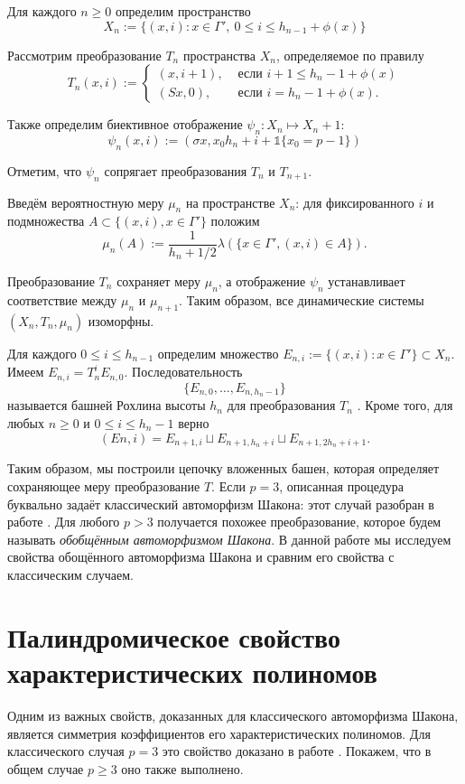 \documentclass[14pt, a4paper, russian]{report}
\begin{document}
Для каждого $n \ge 0$ определим пространство
$$X_n:=\{(x,i): x \in \Gamma',\ 0 \le i \le h_{n-1} + \phi(x)\}$$

Рассмотрим преобразование $T_n$ пространства $X_n$, определяемое по правилу
$$T_n(x, i) := \begin{cases}
(x,i+1), & \text{ если } i+1 \le h_n - 1 + \phi(x) \\
(Sx,0), & \text{ если } i=h_n-1+\phi(x). \end{cases}$$

Также определим биективное отображение $\psi_n : X_n \mapsto X_n+1$:
$$\psi_n(x,i):=(\sigma x, x_0 h_n + i + \mathbb{1}\{x_0=p-1\})$$

Отметим, что $\psi_n$ сопрягает преобразования $T_n$ и
$T_{n+1}$.

Введём вероятностную меру $\mu_n$ на пространстве $X_n$: для фиксированного $i$ и подмножества
$A \subset \{(x, i), x\in\Gamma' \}$ положим
$$\mu_n(A):=\frac{1}{h_n + 1/2} \lambda (\{x \in \Gamma', (x, i) \in A\}).$$

Преобразование $T_n$ сохраняет меру $\mu_n$, а отображение $\psi_n$ устанавливает соответствие между $\mu_n$ и $\mu_{n+1}$. Таким образом, все динамические системы $(X_n, T_n, \mu_n)$ изоморфны.

Для каждого $ 0 \le i \le h_{n-1}$ определим множество
$E_{n,i} := \{(x, i) : x \in \Gamma'\} \subset X_n$. Имеем $E_{n,i} = T^i_n E_{n,0}$. Последовательность
 $$\{E_{n,0},\ldots,E_{n,h_n-1}\}$$
называется башней Рохлина высоты $h_n$ для преобразования $T_n$ \cite{rokhlin_towers}. Кроме того, для любых $n \ge 0$ и $0 \le i \le h_n-1$ верно 
\begin{equation}\label{eq:embedding}
(En,i) = E_{n+1,i} \sqcup E_{n+1,h_n+i} \sqcup E_{n+1,2h_n+i+1}.
\end{equation}

Таким образом, мы построили цепочку вложенных башен, которая определяет сохраняющее меру преобразование $T$. Если $p=3$, описанная процедура буквально задаёт классический автоморфизм Шакона: этот случай разобран в работе \cite{weaklimits}. Для любого $p > 3$ получается похожее преобразование, которое будем называть \emph{обобщённым автоморфизмом Шакона}. В данной работе мы исследуем свойства обощённого автоморфизма Шакона и сравним его свойства с классическим случаем.

\chapter{Палиндромическое свойство характеристических полиномов}
Одним из важных свойств, доказанных для классического автоморфизма Шакона, является симметрия коэффициентов его характеристических полиномов. Для классического случая $p=3$  это свойство доказано в работе \cite{weaklimits}. Покажем, что в общем случае $p \ge 3$ оно также выполнено.
\end{document}
